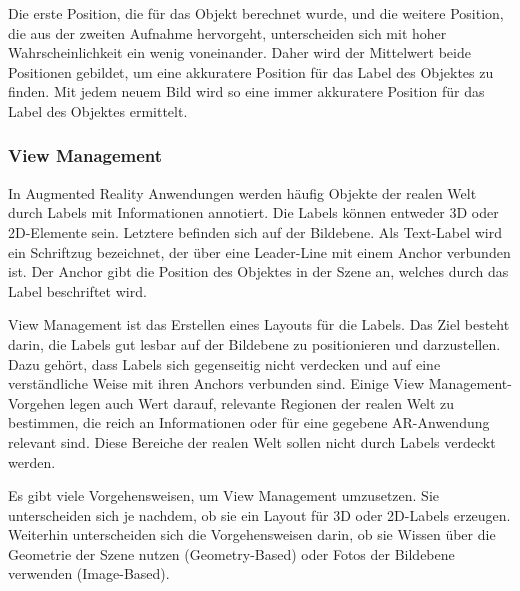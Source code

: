 Die erste Position, die für das Objekt berechnet wurde, und die weitere Position, die aus der zweiten Aufnahme hervorgeht, unterscheiden sich mit hoher Wahrscheinlichkeit ein wenig voneinander. Daher wird der Mittelwert beide Positionen gebildet, um eine akkuratere Position für das Label des Objektes zu finden. Mit jedem neuem Bild wird so eine immer akkuratere  Position für das Label des Objektes ermittelt.
\citep{LabelingLanguageLearning}


\subsubsection{View Management}

In Augmented Reality Anwendungen werden häufig Objekte der realen Welt durch Labels mit Informationen annotiert. Die Labels können entweder 3D oder 2D-Elemente sein. Letztere befinden sich auf der Bildebene. Als Text-Label wird ein Schriftzug bezeichnet, der über eine Leader-Line mit einem Anchor verbunden ist. Der Anchor gibt die Position des Objektes in der Szene an, welches durch das Label beschriftet wird.

View Management ist das Erstellen eines Layouts für die Labels. Das Ziel besteht darin, die Labels gut lesbar auf der Bildebene zu positionieren und darzustellen. Dazu gehört, dass Labels sich gegenseitig nicht verdecken und auf eine verständliche Weise mit ihren Anchors verbunden sind. Einige View Management-Vorgehen legen auch Wert darauf, relevante Regionen der realen Welt zu bestimmen, die reich an Informationen oder für eine gegebene AR-Anwendung relevant sind. Diese Bereiche der realen Welt sollen nicht durch Labels verdeckt werden.

Es gibt viele Vorgehensweisen, um View Management umzusetzen. Sie unterscheiden sich je nachdem, ob sie ein Layout für 3D oder 2D-Labels erzeugen. Weiterhin unterscheiden sich die Vorgehensweisen darin, ob sie Wissen über die Geometrie der Szene nutzen (Geometry-Based) oder Fotos der Bildebene verwenden (Image-Based).


